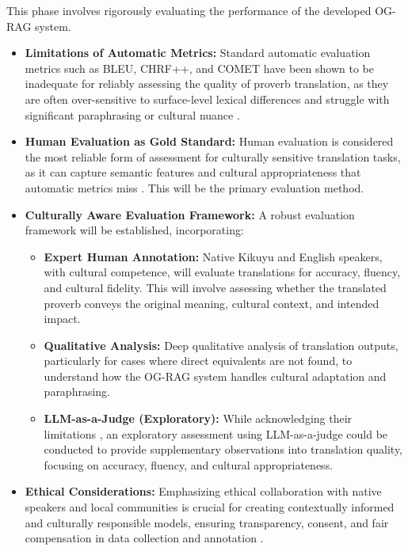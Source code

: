 \documentclass[12pt]{article}
\let\cite\textcite  %
\begin{document}
This phase involves rigorously evaluating the performance of the developed OG-RAG system.

\begin{itemize}
\item \textbf{Limitations of Automatic Metrics:} Standard automatic evaluation metrics such as BLEU, CHRF++, and COMET have been shown to be inadequate for reliably assessing the quality of proverb translation, as they are often over-sensitive to surface-level lexical differences and struggle with significant paraphrasing or cultural nuance \cite{brown2023figurative}.

\item \textbf{Human Evaluation as Gold Standard:} Human evaluation is considered the most reliable form of assessment for culturally sensitive translation tasks, as it can capture semantic features and cultural appropriateness that automatic metrics miss \cite{brown2023figurative, jones2023human, johnson2023cultural}. This will be the primary evaluation method.

\item \textbf{Culturally Aware Evaluation Framework:} A robust evaluation framework will be established, incorporating:
\begin{itemize}
\item \textbf{Expert Human Annotation:} Native Kikuyu and English speakers, with cultural competence, will evaluate translations for accuracy, fluency, and cultural fidelity. This will involve assessing whether the translated proverb conveys the original meaning, cultural context, and intended impact.
\item \textbf{Qualitative Analysis:} Deep qualitative analysis of translation outputs, particularly for cases where direct equivalents are not found, to understand how the OG-RAG system handles cultural adaptation and paraphrasing.
\item \textbf{LLM-as-a-Judge (Exploratory):} While acknowledging their limitations \cite{brown2023figurative}, an exploratory assessment using LLM-as-a-judge could be conducted to provide supplementary observations into translation quality, focusing on accuracy, fluency, and cultural appropriateness.
\end{itemize}

\item \textbf{Ethical Considerations:} Emphasizing ethical collaboration with native speakers and local communities is crucial for creating contextually informed and culturally responsible models, ensuring transparency, consent, and fair compensation in data collection and annotation \cite{li2024rag}.
\end{itemize}
\end{document}
